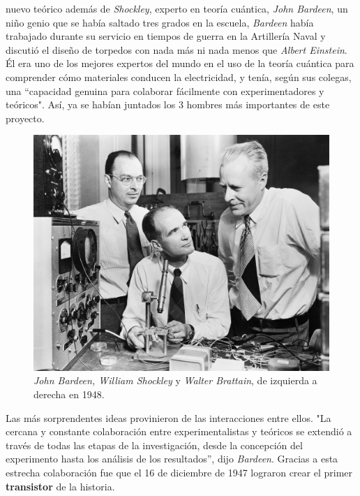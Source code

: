 nuevo teórico además de \emph{Shockley}, experto en teoría cuántica, \emph{John Bardeen}, un niño
genio que se había saltado tres grados en la escuela, \emph{Bardeen } había trabajado durante su servicio
en tiempos de guerra en la Artillería Naval y discutió el diseño de torpedos con nada más ni nada menos que 
\emph{Albert Einstein}. Él era uno de los mejores expertos del mundo en el uso de la teoría cuántica
para comprender cómo materiales conducen la electricidad, y tenía, según sus colegas, una “capacidad genuina
para colaborar fácilmente con experimentadores y teóricos". Así, ya se habían juntados los 3 hombres más importantes
de este proyecto. \\
\newpage

\begin{figure}[htb]
	\centering
	\includegraphics[scale = 0.13]{Graphics/Bardeen_Shockley_Brattain_1948.jpg}
\caption{\emph{John Bardeen, William Shockley} y \emph{Walter Brattain}, de izquierda a derecha en 1948.}
	\label{fig:2}
\end{figure}

Las más sorprendentes ideas provinieron de las interacciones entre ellos. "La cercana y constante colaboración entre
experimentalistas y teóricos se extendió a través de todas las etapas de la investigación, desde la concepción del
experimento hasta los análisis de los resultados”, dijo \emph{Bardeen}. Gracias a esta estrecha colaboración fue que 
el 16 de diciembre de 1947 lograron crear el primer \textbf{transistor} de la historia.\\


